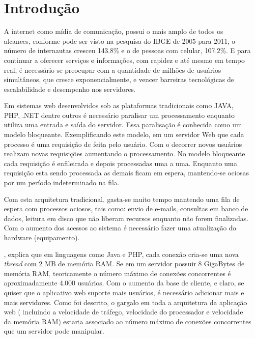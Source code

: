 \chapter{Introdução}
\label{introducao}

\vspace{-1.9cm}

  
  A internet como mídia de comunicação, possui o mais amplo de todos os alcances, 
  conforme pode ser visto na pesquisa do IBGE de 2005 para 2011, 
  o número de internautas cresceu 143.8\%  e o de pessoas com celular, 107.2\%. 
  E para continuar a oferecer serviços e informações, com rapidez e até mesmo em tempo real, 
  é necessário se preocupar com a quantidade de milhões de usuários simultâneos, 
  que cresce exponencialmente, e vencer barreiras tecnológicas de escalabilidade e desempenho nos servidores.
  
  Em sistemas web desenvolvidos sob as plataformas tradicionais como JAVA, \ac{PHP}, .NET dentre outros 
  é necessário paralisar um processamento enquanto utiliza uma entrada e saída do servidor. 
  Essa paralisação é conhecida como um modelo bloqueante. Exemplificando este modelo, em um servidor Web 
  que cada processo é uma requisição de feita pelo usuário. Com o decorrer novos usuários realizam novas 
  requisições aumentando o processamento. No modelo bloqueante cada requisição é enfileirada e depois 
  processadas uma a uma. Enquanto uma requisição esta sendo processada as demais ficam em espera, 
  mantendo-se ociosas por um período indeterminado na fila.\cite{Pereira:2013}
  
  Com esta arquitetura tradicional, gasta-se muito tempo mantendo uma fila de espera com processos ociosos,
  tais como: envio de e-mails, consultas em banco de dados, leitura em disco que não liberam recursos enquanto
  não forem finalizadas. Com o aumento dos acessos ao sistema é necessário fazer uma atualização
  do hardware (equipamento).\cite{Pereira:2013}
  
  , explica que em linguagens como Java e PHP, cada conexão cria-se uma 
  nova \textit{thread} com 2 MB de memória RAM. Se em um servidor possuir 8 GigaBytes de memória RAM, 
  teoricamente o número máximo de conexões concorrentes é aproximadamente 4.000 usuários. 
  Com o aumento da base de cliente, e claro, se quiser que o aplicativo web suporte mais usuários, é necessário 
  adicionar mais e mais servidores. Como foi descrito, o gargalo em toda a arquitetura 
  da aplicação web ( incluindo a velocidade de tráfego, velocidade do processador e velocidade da memória RAM) 
  estaria associado ao número máximo de conexões concorrentes que um servidor pode manipular.
  
